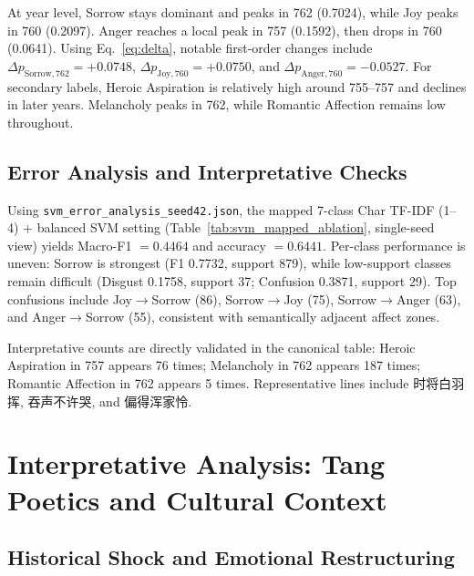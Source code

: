 \documentclass[11pt]{article}
\newcommand{\zh}[1]{{\zhfont #1}}
\begin{document}
At year level, Sorrow stays dominant and peaks in 762 (0.7024), while Joy peaks in 760 (0.2097).
Anger reaches a local peak in 757 (0.1592), then drops in 760 (0.0641).
Using Eq.~\ref{eq:delta}, notable first-order changes include \(\Delta p_{\text{Sorrow},762}=+0.0748\), \(\Delta p_{\text{Joy},760}=+0.0750\), and \(\Delta p_{\text{Anger},760}=-0.0527\).
For secondary labels, Heroic Aspiration is relatively high around 755--757 and declines in later years.
Melancholy peaks in 762, while Romantic Affection remains low throughout.

\subsection{Error Analysis and Interpretative Checks}

Using \texttt{svm\_error\_analysis\_seed42.json}, the mapped 7-class Char TF-IDF (1--4) + balanced SVM setting (Table~\ref{tab:svm_mapped_ablation}, single-seed view) yields Macro-F1 \(=0.4464\) and accuracy \(=0.6441\).
Per-class performance is uneven: Sorrow is strongest (F1 0.7732, support 879), while low-support classes remain difficult (Disgust 0.1758, support 37; Confusion 0.3871, support 29).
Top confusions include Joy\(\rightarrow\)Sorrow (86), Sorrow\(\rightarrow\)Joy (75), Sorrow\(\rightarrow\)Anger (63), and Anger\(\rightarrow\)Sorrow (55), consistent with semantically adjacent affect zones.

Interpretative counts are directly validated in the canonical table:
Heroic Aspiration in 757 appears 76 times; Melancholy in 762 appears 187 times; Romantic Affection in 762 appears 5 times.
Representative lines include \zh{时将白羽挥}, \zh{吞声不许哭}, and \zh{偏得浑家怜}.

\section{Interpretative Analysis: Tang Poetics and Cultural Context}

\subsection{Historical Shock and Emotional Restructuring}
\end{document}
